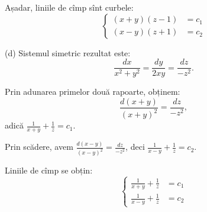 \documentclass[11pt,a4paper]{article}
\theoremstyle{dotless}
\theoremstyle{dotlessdr}
\begin{document}
Așadar, liniile de cîmp sînt curbele:
\[
  \begin{cases}
    (x + y)(z - 1) &= c_1 \\
    (x - y)(z + 1) &= c_2
  \end{cases}
\]

\vspace{1cm}

(d) Sistemul simetric rezultat este:
\[
  \frac{dx}{x^2 + y^2} = \frac{dy}{2xy} = \frac{dz}{-z^2}.
\]

Prin adunarea primelor două rapoarte, obținem:
\[
  \frac{d(x + y)}{(x + y)^2} = \frac{dz}{-z^2},
\]
adică $\frac{1}{x + y} + \frac{1}{z} = c_1$.

Prin scădere, avem $\frac{d(x - y)}{(x - y)^2} = \frac{dz}{-z^2}$, deci
$\frac{1}{x - y} + \frac{1}{z} = c_2$.

Liniile de cîmp se obțin:
\[
  \begin{cases}
    \frac{1}{x + y} + \frac{1}{z} &= c_1 \\
    \frac{1}{x - y} + \frac{1}{z} &= c_2
  \end{cases}
\]

\end{document}
